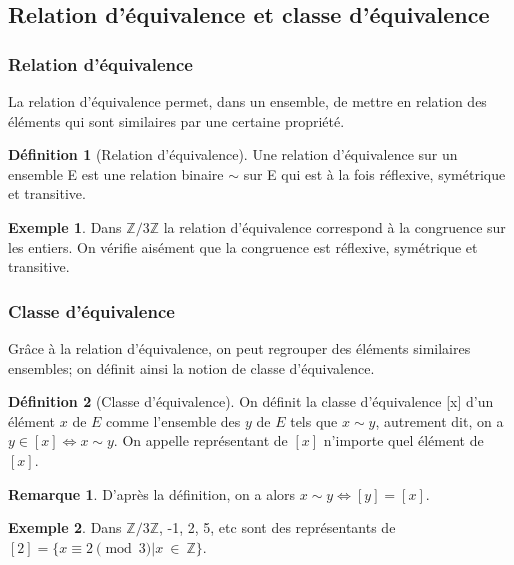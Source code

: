\documentclass[a4paper,12pt,titlepage]{article}
\theoremstyle{plain}
\theoremstyle{definition}
\newtheorem{defi}{Définition}
\newtheorem{rmq}{Remarque}
\newtheorem{ex}{Exemple}
\begin{document}
\subsection{Relation d'équivalence et classe d'équivalence}
\subsubsection{Relation d'équivalence}
La relation d'équivalence permet, dans un ensemble, de mettre en relation des éléments qui sont similaires par une certaine propriété.
\begin{defi}[Relation d'équivalence]
  Une relation d'équivalence sur un ensemble E est une relation binaire $\sim$ sur E qui est à la fois réflexive, symétrique et transitive.
\end{defi}
\begin{ex}
  Dans $\mathbb{Z}/3\mathbb{Z}$ la relation d'équivalence correspond à la congruence sur les entiers. On vérifie aisément que la congruence est réflexive, symétrique et transitive.
\end{ex}
\subsubsection{Classe d'équivalence}
Grâce à la relation d'équivalence, on peut regrouper des éléments similaires ensembles; on définit ainsi la notion de classe d'équivalence.
\begin{defi}[Classe d'équivalence]
  On définit la classe d'équivalence [x] d'un élément $x$ de $E$ comme l'ensemble des $y$ de $E$ tels que $x \sim  y$, autrement dit, on a $y \in [x] \Leftrightarrow x \sim  y$. On appelle représentant de $[x]$ n'importe quel élément de $[x]$.
\end{defi}

\begin{rmq}
D'après la définition, on a alors $x \sim  y \Leftrightarrow  [y] = [x]$.
\end{rmq}

\begin{ex}
  Dans $\mathbb{Z}/3\mathbb{Z}$, -1, 2, 5, etc sont des représentants de $[2] = \{x \equiv 2 \pmod{3}|x~\in~\mathbb{Z}\}$.
\end{ex}
\end{document}
